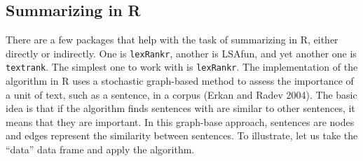 \subsection{Summarizing in R}\label{summarization-in-r}

There are a few packages that help with the task of summarizing in R,
either directly or indirectly. One is \texttt{lexRankr}, another is
LSAfun, and yet another one is \texttt{textrank}. The simplest one to
work with is \texttt{lexRankr}. The implementation of the algorithm in R
uses a stochastic graph-based method to assess the importance of a unit of text, such as a sentence, in a corpus (Erkan and Radev 2004). The basic
idea is that if the algorithm finds sentences with are similar to other
sentences, it means that they are important. In this graph-base
approach, sentences are nodes and edges represent the similarity between
sentences. To illustrate, let us take the ``data'' data frame and apply
the algorithm.

